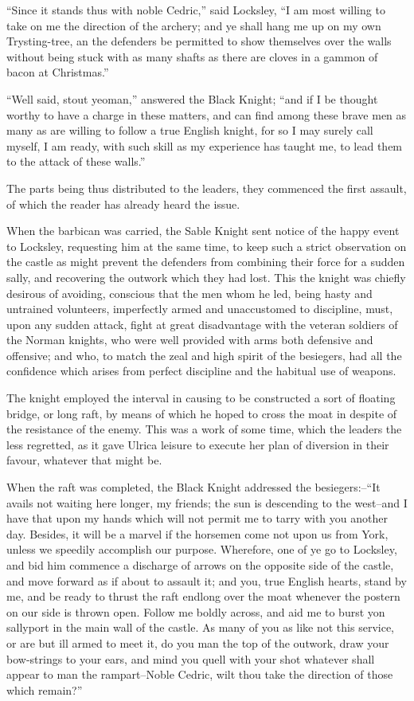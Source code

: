 ``Since it stands thus with noble Cedric,'' said Locksley, ``I am most
willing to take on me the direction of the archery; and ye shall hang me
up on my own Trysting-tree, an the defenders be permitted to show
themselves over the walls without being stuck with as many shafts as
there are cloves in a gammon of bacon at Christmas.''

``Well said, stout yeoman,'' answered the Black Knight; ``and if I be
thought worthy to have a charge in these matters, and can find among
these brave men as many as are willing to follow a true English knight,
for so I may surely call myself, I am ready, with such skill as my
experience has taught me, to lead them to the attack of these walls.''

The parts being thus distributed to the leaders, they commenced the
first assault, of which the reader has already heard the issue.

When the barbican was carried, the Sable Knight sent notice of the happy
event to Locksley, requesting him at the same time, to keep such a
strict observation on the castle as might prevent the defenders from
combining their force for a sudden sally, and recovering the outwork
which they had lost. This the knight was chiefly desirous of avoiding,
conscious that the men whom he led, being hasty and untrained
volunteers, imperfectly armed and unaccustomed to discipline, must, upon
any sudden attack, fight at great disadvantage with the veteran soldiers
of the Norman knights, who were well provided with arms both defensive
and offensive; and who, to match the zeal and high spirit of the
besiegers, had all the confidence which arises from perfect discipline
and the habitual use of weapons.

The knight employed the interval in causing to be constructed a sort of
floating bridge, or long raft, by means of which he hoped to cross the
moat in despite of the resistance of the enemy. This was a work of some
time, which the leaders the less regretted, as it gave Ulrica leisure to
execute her plan of diversion in their favour, whatever that might be.

When the raft was completed, the Black Knight addressed the
besiegers:--``It avails not waiting here longer, my friends; the sun is
descending to the west--and I have that upon my hands which will not
permit me to tarry with you another day. Besides, it will be a marvel if
the horsemen come not upon us from York, unless we speedily accomplish
our purpose. Wherefore, one of ye go to Locksley, and bid him commence a
discharge of arrows on the opposite side of the castle, and move forward
as if about to assault it; and you, true English hearts, stand by me,
and be ready to thrust the raft endlong over the moat whenever the
postern on our side is thrown open. Follow me boldly across, and aid me
to burst yon sallyport in the main wall of the castle. As many of you as
like not this service, or are but ill armed to meet it, do you man the
top of the outwork, draw your bow-strings to your ears, and mind you
quell with your shot whatever shall appear to man the rampart--Noble
Cedric, wilt thou take the direction of those which remain?''


